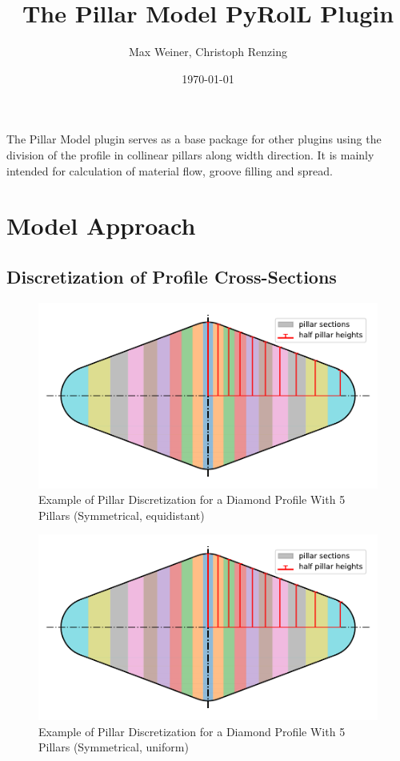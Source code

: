 \documentclass[11pt]{PyRollDocs}
\begin{document}
    \title{The Pillar Model PyRolL Plugin}
    \author{Max Weiner, Christoph Renzing}
    \date{\today}

    \maketitle

    The Pillar Model plugin serves as a base package for other plugins using the division of the profile in collinear pillars along width direction.
    It is mainly intended for calculation of material flow, groove filling and spread.


    \section{Model Approach}\label{sec:model-approach}

    \subsection{Discretization of Profile Cross-Sections}\label{subsec:discretization-of-profile-cross-sections}

    \begin{figure}
        \centering
        \includegraphics[width=0.6\linewidth]{img/pillar_profile_equidistant}
        \caption{Example of Pillar Discretization for a Diamond Profile With 5 Pillars (Symmetrical, equidistant)}
        \label{fig:pillar_profile_equidistant}
    \end{figure}

    \begin{figure}
        \centering
        \includegraphics[width=0.6\linewidth]{img/pillar_profile_uniform}
        \caption{Example of Pillar Discretization for a Diamond Profile With 5 Pillars (Symmetrical, uniform)}
        \label{fig:pillar_profile_uniform}
    \end{figure}
\end{document}
